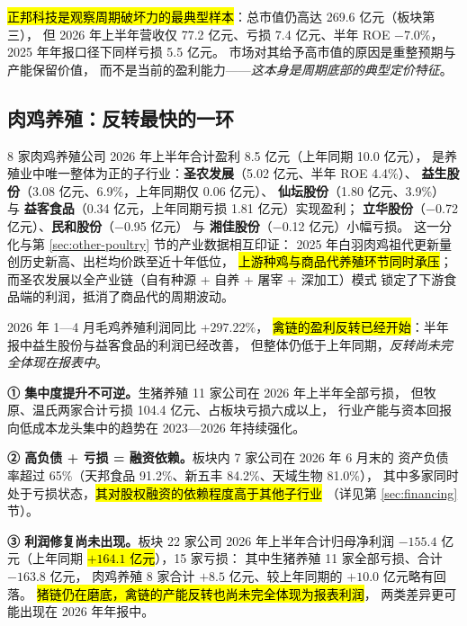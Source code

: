 \hl{正邦科技是观察周期破坏力的最典型样本}：总市值仍高达 \num{269.6} 亿元（板块第三），
但 2026 年上半年营收仅 \num{77.2} 亿元、亏损 \num{7.4} 亿元、半年 ROE \num{-7.0}\%，
2025 年年报口径下同样亏损 \num{5.5} 亿元。
市场对其给予高市值的原因是重整预期与产能保留价值，
而不是当前的盈利能力——\emph{这本身是周期底部的典型定价特征}。

\subsection{肉鸡养殖：反转最快的一环}
\label{sec:breeding-poultry}

\num{8} 家肉鸡养殖公司 2026 年上半年合计盈利 \num{8.5} 亿元（上年同期 \num{10.0} 亿元），
是养殖业中唯一整体为正的子行业：\textbf{圣农发展}（\num{5.02} 亿元、半年 ROE \num{4.4}\%）、
\textbf{益生股份}（\num{3.08} 亿元、\num{6.9}\%，上年同期仅 \num{0.06} 亿元）、
\textbf{仙坛股份}（\num{1.80} 亿元、\num{3.9}\%）
与 \textbf{益客食品}（\num{0.34} 亿元，上年同期亏损 \num{1.81} 亿元）实现盈利；
\textbf{立华股份}（\num{-0.72} 亿元）、\textbf{民和股份}（\num{-0.95} 亿元）
与 \textbf{湘佳股份}（\num{-0.12} 亿元）小幅亏损。
这一分化与第 \ref{sec:other-poultry} 节的产业数据相互印证：
2025 年白羽肉鸡祖代更新量创历史新高、出栏均价跌至近十年低位，
\hl{上游种鸡与商品代养殖环节同时承压}；
而圣农发展以全产业链（自有种源 + 自养 + 屠宰 + 深加工）模式
锁定了下游食品端的利润，抵消了商品代的周期波动。

2026 年 1---4 月毛鸡养殖利润同比 +$297.22\%$，
\hl{禽链的盈利反转已经开始}：半年报中益生股份与益客食品的利润已经改善，
但整体仍低于上年同期，\emph{反转尚未完全体现在报表中}。

\begin{keybox}[养殖业的三点判断]
\normalsize
\textbf{① 集中度提升不可逆。}生猪养殖 11 家公司在 2026 年上半年全部亏损，
但牧原、温氏两家合计亏损 \num{104.4} 亿元、占板块亏损六成以上，
行业产能与资本回报向低成本龙头集中的趋势在 2023---2026 年持续强化。\par\vspace{3pt}
\textbf{② 高负债 + 亏损 = 融资依赖。}板块内 \num{7} 家公司在 2026 年 6 月末的
资产负债率超过 \num{65}\%（天邦食品 \num{91.2}\%、新五丰 \num{84.2}\%、天域生物 \num{81.0}\%），
其中多家同时处于亏损状态，\hl{其对股权融资的依赖程度高于其他子行业}
（详见第 \ref{sec:financing} 节）。\par\vspace{3pt}
\textbf{③ 利润修复尚未出现。}板块 \num{22} 家公司 2026 年上半年合计归母净利润
$-155.4$ 亿元（上年同期 \hl{$+164.1$ 亿元}），\num{15} 家亏损：
其中生猪养殖 \num{11} 家全部亏损、合计 $-163.8$ 亿元，
肉鸡养殖 \num{8} 家合计 $+8.5$ 亿元、较上年同期的 $+10.0$ 亿元略有回落。
\hl{猪链仍在磨底，禽链的产能反转也尚未完全体现为报表利润}，
两类差异更可能出现在 2026 年年报中。
\end{keybox}


